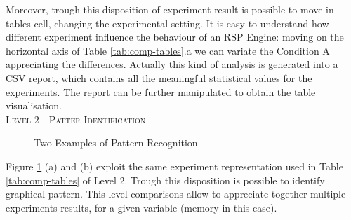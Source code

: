 Moreover, trough this disposition of experiment result is possible to move in tables cell, changing the experimental setting. It is easy to understand how different experiment influence the behaviour of an RSP Engine: moving on the horizontal axis of Table \ref{tab:comp-tables}.a we can variate the Condition A appreciating the differences. Actually this kind of analysis is generated into a CSV report, which contains all the meaningful statistical values for the experiments. The report can be further manipulated to obtain the table visualisation. \\

\textsc{Level 2 - Patter Identification}\\

\begin{figure}[tbh]
  \centering
	
	\caption{Two Examples of Pattern Recognition} 
  	\label{fig:pattern-examples}
\end{figure}

Figure \ref{fig:pattern-examples} (a) and (b) exploit the same experiment representation used in Table \ref{tab:comp-tables} of Level 2. Trough this disposition is possible to identify graphical pattern. This level comparisons allow to appreciate together multiple experiments results, for a given variable (memory in this case). 

